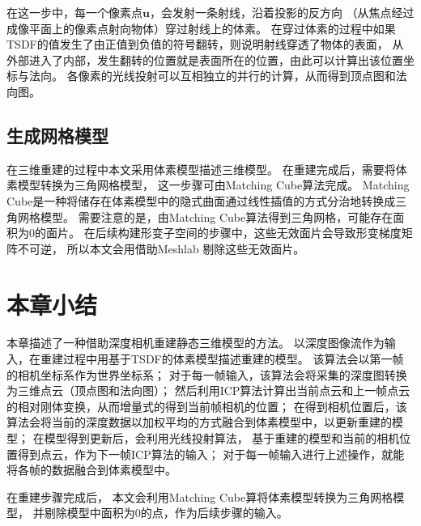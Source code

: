 在这一步中，每一个像素点$\bm{u}$，会发射一条射线，沿着投影的反方向
（从焦点经过成像平面上的像素点射向物体）穿过射线上的体素。
在穿过体素的过程中如果TSDF的值发生了由正值到负值的符号翻转，则说明射线穿透了物体的表面，
从外部进入了内部，发生翻转的位置就是表面所在的位置，由此可以计算出该位置坐标与法向。
各像素的光线投射可以互相独立的并行的计算，从而得到顶点图和法向图。

\subsection{生成网格模型}
在三维重建的过程中本文采用体素模型描述三维模型。
在重建完成后，需要将体素模型转换为三角网格模型，
这一步骤可由Matching Cube算法\cite{lorensen1987marching}完成。 
Matching Cube是一种将储存在体素模型中的隐式曲面通过线性插值的方式分治地转换成三角网格模型。
需要注意的是，由Matching Cube算法\cite{lorensen1987marching}得到三角网格，可能存在面积为0的面片。
在后续构建形变子空间的步骤中，这些无效面片会导致形变梯度矩阵不可逆，
所以本文会用借助Meshlab\cite{LocalChapterEvents:ItalChap:ItalianChapConf2008:129-136}
剔除这些无效面片。

\section{本章小结}
本章描述了一种借助深度相机重建静态三维模型的方法。
以深度图像流作为输入，在重建过程中用基于TSDF的体素模型描述重建的模型。
该算法会以第一帧的相机坐标系作为世界坐标系；
对于每一帧输入，该算法会将采集的深度图转换为三维点云（顶点图和法向图）；
然后利用ICP算法计算出当前点云和上一帧点云的相对刚体变换，从而增量式的得到当前帧相机的位置；
在得到相机位置后，该算法会将当前的深度数据以加权平均的方式融合到体素模型中，以更新重建的模型；
在模型得到更新后，会利用光线投射算法，
基于重建的模型和当前的相机位置得到点云，作为下一帧ICP算法的输入；
对于每一帧输入进行上述操作，就能将各帧的数据融合到体素模型中。

在重建步骤完成后，
本文会利用Matching Cube算\cite{lorensen1987marching}将体素模型转换为三角网格模型，
并剔除模型中面积为0的点，作为后续步骤的输入。




